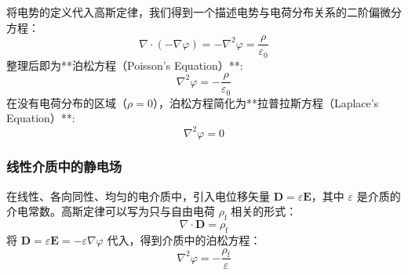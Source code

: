\documentclass[fontset=none]{ctexart}
\begin{document}
将电势的定义代入高斯定律，我们得到一个描述电势与电荷分布关系的二阶偏微分方程：
\begin{equation}
    \nabla \cdot (-\nabla \varphi) = -\nabla^2 \varphi = \frac{\rho}{\varepsilon_0}
\end{equation}
整理后即为**泊松方程（Poisson's Equation）**:
\begin{equation}
    \nabla^2 \varphi = -\frac{\rho}{\varepsilon_0}
\end{equation}
在没有电荷分布的区域（$\rho=0$），泊松方程简化为**拉普拉斯方程（Laplace's Equation）**:
\begin{equation}
    \nabla^2 \varphi = 0
\end{equation}

\subsubsection{线性介质中的静电场}
在线性、各向同性、均匀的电介质中，引入电位移矢量 $\bm{D} = \varepsilon \bm{E}$，其中 $\varepsilon$ 是介质的介电常数。高斯定律可以写为只与自由电荷 $\rho_{\mathrm{f}}$ 相关的形式：
\begin{equation}
    \nabla \cdot \bm{D} = \rho_{\mathrm{f}}
\end{equation}
将 $\bm{D} = \varepsilon \bm{E} = -\varepsilon \nabla \varphi$ 代入，得到介质中的泊松方程：
\begin{equation}
    \nabla^2 \varphi = -\frac{\rho_{\mathrm{f}}}{\varepsilon}
\end{equation}
\end{document}
